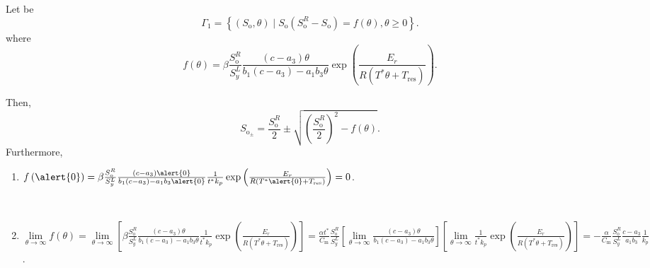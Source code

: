 \documentclass[
    8pt,
    aspectratio=1610,
    c,
    intlimits,
    leqno,
    professionalfonts,
]{beamer}
\begin{document}
\begin{frame}
	Let be
	\begin{equation*}
		\Gamma_{1}=
		\left\{
		\left(S_{\text{o}},\theta\right)\mid
		S_{\text{o}}
		\left(
		S^{R}_{\text{o}}-
		S_{\text{o}}
		\right)=
		f\left(\theta\right),\theta\geq0
		\right\}.
	\end{equation*}
	where
	\begin{equation*}
		f\left(\theta\right)=
		\beta
		\frac{S^{R}_{\text{o}}}{S^{L}_{y}}
		\frac{
			\left(c-a_{3}\right)\theta}{
			b_{1}
			\left(c-a_{3}\right)-
			a_{1}
			b_{3}
			\theta
		}
		\exp
		\left(
		\frac{E_{r}}{
			R\left(T^{\ast}\theta+T_{\text{res}}\right)
		}
		\right).
	\end{equation*}

	Then,
	\begin{equation*}
		S_{\text{o}_{\pm}}=
		\frac{S^{R}_{\text{o}}}{2}\pm
		\sqrt{{\left(\frac{S^{R}_{\text{o}}}{2}\right)}^{2}-f\left(\theta\right)}.
	\end{equation*}
	Furthermore,
	\begin{enumerate}
		\item

		      \begin{math}
			      f\left(\alert{0}\right)=
			      \beta
			      \frac{S^{R}_{\text{o}}}{S^{L}_{y}}
			      \frac{
				      \left(c-a_{3}\right)\alert{0}}{
				      b_{1}
				      \left(c-a_{3}\right)-
				      a_{1}
				      b_{3}
				      \alert{0}
			      }
			      \frac{1}{t^{\ast}k_{p}}
			      \exp
			      \left(
			      \frac{E_{r}}{
				      R\left(T^{\ast}\alert{0}+T_{\text{res}}\right)
			      }
			      \right)=0
		      \end{math}.

		      \

		\item

		      \begin{math}
			      \lim\limits_{\theta\to\infty}
			      f\left(\theta\right)=
			      \lim\limits_{\theta\to\infty}
			      \left[
			      \beta
			      \frac{S^{R}_{\text{o}}}{S^{L}_{y}}
			      \frac{
				      \left(c-a_{3}\right)\theta}{
				      b_{1}
				      \left(c-a_{3}\right)-
				      a_{1}
				      b_{3}
				      \theta
			      }
			      \frac{1}{t^{\ast}k_{p}}
			      \exp
			      \left(
			      \frac{E_{r}}{
				      R\left(T^{\ast}\theta+T_{\text{res}}\right)
			      }
			      \right)
			      \right]=
			      \frac{\alpha t^{\ast}}{C_{\text{m}}}
			      \frac{S^{R}_{\text{o}}}{S^{L}_{y}}
			      \left[
				      \lim\limits_{\theta\to\infty}
				      \frac{
					      \left(c-a_{3}\right)\theta}{
					      b_{1}
					      \left(c-a_{3}\right)-
					      a_{1}
					      b_{3}
					      \theta
				      }
				      \right]
			      \left[
			      \lim\limits_{\theta\to\infty}
			      \frac{1}{t^{\ast}k_{p}}
			      \exp
			      \left(
			      \frac{E_{r}}{
				      R\left(T^{\ast}\theta+T_{\text{res}}\right)
			      }
			      \right)
			      \right]=
			      -\frac{\alpha}{C_{\text{m}}}
			      \frac{S^{R}_{\text{o}}}{S^{L}_{y}}
			      \frac{c-a_{3}}{a_{1}b_{3}}
			      \frac{1}{k_{p}}
		      \end{math}.


\end{enumerate}
\end{frame}
\end{document}
